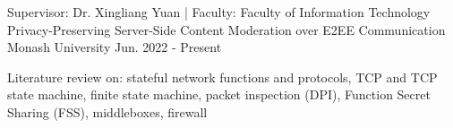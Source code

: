 


\begin{cventries}


   \cventry
   {Supervisor: Dr. Xingliang Yuan | Faculty: Faculty of Information Technology} %
   {Privacy-Preserving Server-Side Content Moderation over E2EE Communication} %
   {Monash University} %
   {Jun. 2022 - Present} %
   {
      \begin{cvitems} %
         \item {Literature review on: stateful network functions and protocols, TCP and TCP state machine, finite state machine, packet inspection (DPI), Function Secret Sharing (FSS), middleboxes, firewall}
      \end{cvitems}
   }

\end{cventries}
\vspace{-3.0mm}
